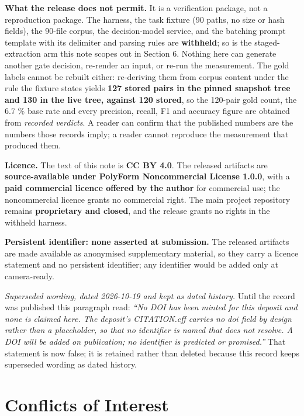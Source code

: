 \documentclass[10pt]{article}
\begin{document}
\textbf{What the release does not permit.} It is a verification package, not a reproduction package. The harness, the task fixture (90 paths, no size or hash fields), the 90-file corpus, the decision-model service, and the batching prompt template with its delimiter and parsing rules are \textbf{withheld}; so is the staged-extraction arm this note scopes out in Section 6. Nothing here can generate another gate decision, re-render an input, or re-run the measurement. The gold labels cannot be rebuilt either: re-deriving them from corpus content under the rule the fixture states yields \textbf{127 stored pairs in the pinned snapshot tree and 130 in the live tree, against 120 stored}, so the 120-pair gold count, the 6.7 \% base rate and every precision, recall, F1 and accuracy figure are obtained from \emph{recorded verdicts}. A reader can confirm that the published numbers are the numbers those records imply; a reader cannot reproduce the measurement that produced them.

\textbf{Licence.} The text of this note is \textbf{CC BY 4.0}. The released artifacts are \textbf{source-available under PolyForm Noncommercial License 1.0.0}, with a \textbf{paid commercial licence offered by the author} for commercial use; the noncommercial licence grants no commercial right. The main project repository remains \textbf{proprietary and closed}, and the release grants no rights in the withheld harness.

\textbf{Persistent identifier: none asserted at submission.} The released artifacts are made available as anonymised supplementary material, so they carry a licence statement and no persistent identifier; any identifier would be added only at camera-ready.

\emph{Superseded wording, dated 2026-10-19 and kept as dated history.} Until the record was published this paragraph read: \emph{``No DOI has been minted for this deposit and none is claimed here. The deposit's CITATION.cff carries no doi field by design rather than a placeholder, so that no identifier is named that does not resolve. A DOI will be added on publication; no identifier is predicted or promised.''} That statement is now false; it is retained rather than deleted because this record keeps superseded wording as dated history.

\section*{Conflicts of Interest}
\end{document}
